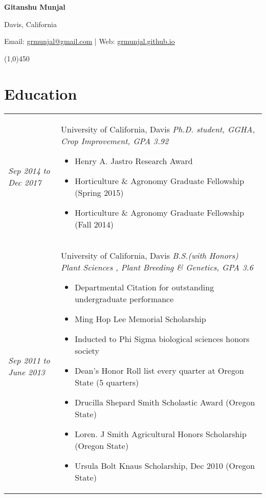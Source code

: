 ﻿\documentclass[a4paper]{article}
\def\name{Gitanshu Munjal}
\begin{document}
\centerline{\huge \bf \name}
\vspace{0.07in}
\centerline{Davis, California}
\centerline{Email: \href{mailto:grmunjal@gmail.com}{grmunjal@gmail.com}  |  Web: \href{http://grmunjal.github.io/}{grmunjal.github.io}}

\begin{center}
\line(1,0){450}
\end{center}


\section*{Education}
\begin{tabular}{p{3cm} p{14cm}}
\vspace{0pt} 
\textit{Sep 2014}\newline
\textit{to}\newline
\textit{Dec 2017}\newline
& 
\vspace{0pt}
{\Large University of California, Davis}\newline
\textit{Ph.D. student, GGHA, Crop Improvement, GPA 3.92}
\begin{itemize}[noitemsep,topsep=0pt]
  \item Henry A. Jastro Research Award 
  \item Horticulture \& Agronomy Graduate Fellowship (Spring 2015)
  \item Horticulture \& Agronomy Graduate Fellowship (Fall 2014)
\end{itemize}
%
\\
%
\vspace{0pt} 
\textit{Sep 2011}\newline
\textit{to}\newline
\textit{June 2013}\newline
& 
\vspace{0pt}
{\Large University of California, Davis}\newline
\textit{B.S.(with Honors) Plant Sciences , Plant Breeding \& Genetics, GPA 3.6}
\begin{itemize}[noitemsep,topsep=0pt]
  \item Departmental Citation for outstanding undergraduate performance
  \item Ming Hop Lee Memorial Scholarship
  \item Inducted to Phi Sigma biological sciences honors society
  \item Dean's Honor Roll list every quarter at Oregon State (5 quarters)
  \item Drucilla Shepard Smith Scholastic Award (Oregon State)
  \item Loren. J Smith Agricultural Honors Scholarship (Oregon State)
  \item Ursula Bolt Knaus Scholarship, Dec 2010 (Oregon State)
\end{itemize}
\end{tabular}
\end{document}
